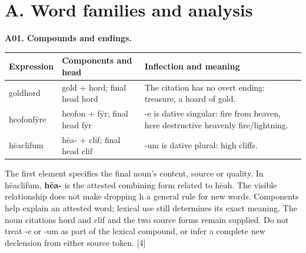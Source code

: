 \section*{A. Word families and analysis}

\par\begin{minipage}{\linewidth}\raggedright
\textbf{A01. Compounds and endings.}

\par\begingroup
\fontsize{10.5}{13.2}\selectfont
\setlength{\LTleft}{0pt}\setlength{\LTright}{\fill}
\noindent
\begin{tabular}{@{}>{\raggedright\arraybackslash}p{22mm}>{\raggedright\arraybackslash}p{32mm}>{\raggedright\arraybackslash}p{64.37mm}@{}}
\toprule
\textbf{Expression} & \textbf{Components and head} & \textbf{Inflection and meaning} \\
\midrule
goldhord & gold + hord; final head hord & The citation has no overt ending: treasure, a hoard of gold. \\
heofonfȳre & heofon + fȳr; final head fȳr & -e is dative singular: fire from heaven, here destructive heavenly fire/\allowbreak{}lightning. \\
hēaclifum & hēa- + clif; final head clif & -um is dative plural: high cliffs. \\
\bottomrule
\end{tabular}
\par\endgroup

The first element specifies the final noun's content, source or quality. In hēaclifum, \textbf{hēa-} is the attested combining form related to hēah. The visible relationship does not make dropping h a general rule for new words. Components help explain an attested word; lexical use still determines its exact meaning. The noun citations hord and clif and the two source forms remain supplied. Do not treat -e or -um as part of the lexical compound, or infer a complete new declension from either source token. [4]

\end{minipage}\par\addvspace{4pt}


